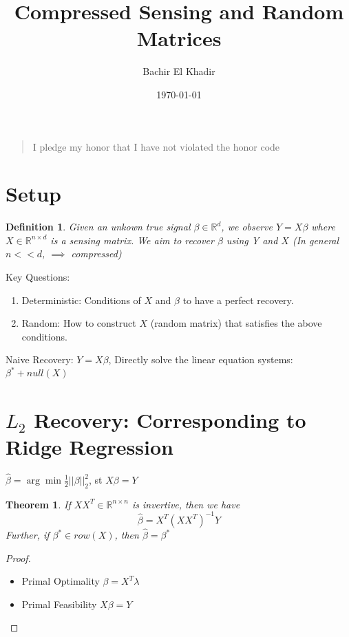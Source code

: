 \documentclass[11pt]{article}
\author{Bachir El Khadir}
\date{\today}
\title{Compressed Sensing and Random Matrices}
\newtheorem{theorem}{Theorem}
\newtheorem{definition}{Definition}
\begin{document}
\maketitle
\begin{quote}
I pledge my honor that I have not violated the honor code
\end{quote}

\section{Setup}
\label{sec:orgheadline1}

\begin{definition}
Given an unkown true signal \(\beta \in \mathbb R^d\), we observe \(Y = X\beta\) where \(X \in \mathbb R^{n \times d}\) is a sensing matrix.
We aim to recover \(\beta\) using Y and \(X\) (In general \(n << d\), \(\implies\) compressed)
\label{orgspecialblock1}

\end{definition}

Key Questions:
\begin{enumerate}
\item Deterministic: Conditions of \(X\) and \(\beta\) to have a perfect recovery.
\item Random: How to construct \(X\) (random matrix) that satisfies the above conditions.
\end{enumerate}


Naive Recovery:
\(Y = X\beta\),  Directly solve the linear equation systems: \(\beta^* + null(X)\)

\section{\(L_2\) Recovery: Corresponding to Ridge Regression}
\label{sec:orgheadline2}

\(\hat \beta = \arg \min \frac12 ||\beta||_2^2\), st \(X\beta = Y\)

\begin{theorem}
If \(XX^T \in \mathbb R^{n \times n}\) is invertive, then we have 
$$\hat \beta = X^T (XX^T)^{-1} Y$$
Further, if \(\beta^* \in row(X)\), then \(\hat \beta = \beta^*\)
\label{orgspecialblock2}

\end{theorem}


\begin{proof}
\begin{itemize}
\item Primal Optimality \(\beta = X^T \lambda\)
\item Primal Feasibility \(X\beta = Y\)
\end{itemize}
\end{proof}
\end{document}
